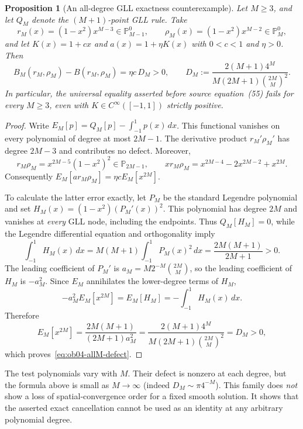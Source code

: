 \documentclass[11pt,a4paper]{amsart}
\theoremstyle{remark}
\theoremstyle{plain}
\newtheorem{proposition}{Proposition}[section]
\theoremstyle{remark}
\numberwithin{equation}{section}
\begin{document}
\begin{proposition}[An all-degree GLL exactness counterexample]\label{prop:ob04-allM}
Let $M\ge3$, and let $Q_M$ denote the $(M+1)$-point GLL rule. Take
\begin{equation}\label{eq:ob04-family}
 r_M(x)=(1-x^2)x^{M-3}\in\mathbb P^0_{M-1},\qquad
 \rho_M(x)=(1-x^2)x^{M-2}\in\mathbb P^0_M,
\end{equation}
and let $K(x)=1+cx$ and $a(x)=1+\eta K(x)$ with $0<c<1$ and $\eta>0$. Then
\begin{equation}\label{eq:ob04-allM-defect}
 B_M(r_M,\rho_M)-B(r_M,\rho_M)
 =\eta c\,D_M>0,\qquad
 D_M:=\frac{2(M+1)4^M}{M(2M+1)\binom{2M}{M}^2}.
\end{equation}
In particular, the universal equality asserted before source equation~(55) fails for every $M\ge3$, even with $K\in C^\infty([-1,1])$ strictly positive.
\end{proposition}
\begin{proof}
Write $E_M[p]=Q_M[p]-\int_{-1}^1p(x)\,dx$. This functional vanishes on every polynomial of degree at most $2M-1$. The derivative product $r_M'\rho_M'$ has degree $2M-3$ and contributes no defect. Moreover,
\[
 r_M\rho_M=x^{2M-5}(1-x^2)^2\in\mathbb P_{2M-1},
 \qquad
 x r_M\rho_M=x^{2M-4}-2x^{2M-2}+x^{2M}.
\]
Consequently $E_M[a r_M\rho_M]=\eta c E_M[x^{2M}]$.

To calculate the latter error exactly, let $P_M$ be the standard Legendre polynomial and set $H_M(x)=(1-x^2)(P_M'(x))^2$. This polynomial has degree $2M$ and vanishes at \emph{every} GLL node, including the endpoints. Thus $Q_M[H_M]=0$, while the Legendre differential equation and orthogonality imply
\[
 \int_{-1}^1 H_M(x)\,dx
 =M(M+1)\int_{-1}^1P_M(x)^2\,dx
 =\frac{2M(M+1)}{2M+1}>0.
\]
The leading coefficient of $P_M'$ is
$a_M=M2^{-M}\binom{2M}{M}$, so the leading coefficient of $H_M$ is $-a_M^2$. Since $E_M$ annihilates the lower-degree terms of $H_M$,
\[
 -a_M^2E_M[x^{2M}]=E_M[H_M]
 =-\int_{-1}^1H_M(x)\,dx.
\]
Therefore
\[
 E_M[x^{2M}]=\frac{2M(M+1)}{(2M+1)a_M^2}
 =\frac{2(M+1)4^M}{M(2M+1)\binom{2M}{M}^2}=D_M>0,
\]
which proves~\eqref{eq:ob04-allM-defect}.
\end{proof}

The test polynomials vary with $M$. Their defect is nonzero at each degree, but the formula above is small as $M\to\infty$ (indeed $D_M\sim\pi 4^{-M}$). This family does \emph{not} show a loss of spatial-convergence order for a fixed smooth solution. It shows that the asserted exact cancellation cannot be used as an identity at any arbitrary polynomial degree.
\end{document}
